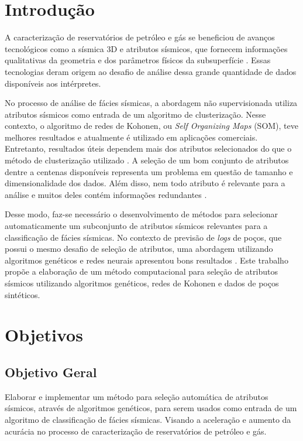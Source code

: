 \documentclass{ufsc-thesis}
\begin{document}
\afterpage{\null\newpage}

\begin{KeepFromToc}
    \tableofcontents
\end{KeepFromToc}

\chapter{Introdução}
A caracterização de reservatórios de petróleo e gás se beneficiou de avanços tecnológicos como a sísmica 3D e atributos sísmicos, que fornecem informações qualitativas da geometria e dos parâmetros físicos da subsuperfície  \cite{Sancevero:2007}. Essas tecnologias deram origem  ao desafio de análise dessa grande quantidade de dados disponíveis aos intérpretes. 

No processo de análise de fácies sísmicas, a abordagem não supervisionada utiliza atributos sísmicos como entrada de um algoritmo de clusterização. Nesse contexto, o algoritmo de redes de Kohonen, ou \textit{Self Organizing Maps} (SOM), teve melhores resultados \cite{Coleou:2003} e atualmente é utilizado em aplicações comerciais. Entretanto, resultados úteis dependem mais dos atributos selecionados do que o método de clusterização utilizado \cite{Barnes:2002}. A seleção de um bom conjunto de atributos dentre a centenas disponíveis representa um problema em questão de tamanho e dimensionalidade dos dados. Além disso, nem todo atributo é relevante para a análise e muitos deles contém informações redundantes \cite{Barnes:2007}.

Desse modo, faz-se necessário o desenvolvimento de métodos para selecionar automaticamente um subconjunto de atributos sísmicos relevantes para a classificação de fácies sísmicas. No contexto de previsão de \textit{logs} de poços, que possui o mesmo desafio de seleção de atributos, uma abordagem utilizando algoritmos genéticos e redes neurais apresentou bons resultados \cite{Dorrington:2004}. Este trabalho propõe a elaboração de um método computacional para seleção de atributos sísmicos utilizando algoritmos genéticos, redes de Kohonen e dados de poços sintéticos.

\chapter{Objetivos}

\section{Objetivo Geral}
Elaborar e implementar um método para seleção automática de atributos sísmicos, através de algoritmos genéticos, para serem usados como entrada de um algoritmo de classificação de fácies sísmicas. Visando a aceleração e aumento da acurácia no processo de caracterização de reservatórios de petróleo e gás.
\end{document}
